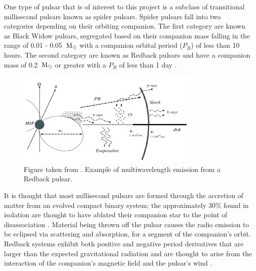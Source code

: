 One type of pulsar that is of interest to this project is a subclass of transitional millisecond pulsars known as spider pulsars. Spider pulsars fall into two categories depending on their orbiting companion. The first category are known as Black Widow pulsars, segregated based on their companion mass falling in the range of 0.01 - 0.05 $\, \text{M}_\odot$ with a companion orbital period ($P_B$) of less than 10 hours. The second category are known as Redback pulsars and have a companion mass of 0.2 $\, \text{M}_\odot$ or greater with a $P_B$ of less than 1 day \citep{papitto_transitional_2022}.

\begin{figure}
\centering
\includegraphics[width=0.8\textwidth]{figs/theory/redback-multiwavelength-emission.jpg}
\caption{Figure taken from \cite{takata_multi-wavelength_2014}. Example of multiwavelength emission from a Redback pulsar.}
\end{figure}

It is thought that most millisecond pulsars are formed through the accretion of matter from an evolved compact binary system; the approximately 30\% found in isolation are thought to have ablated their companion star to the point of disassociation \citep{strader_optical_2019}. Material being thrown off the pulsar causes the radio emission to be eclipsed via scattering and absorption, for a segment of the companion's orbit. Redback systems exhibit both positive and negative period derivatives that are larger than the expected gravitational radiation and are thought to arise from the interaction of the companion's magnetic field and the pulsar's wind \citep{papitto_transitional_2022}.

